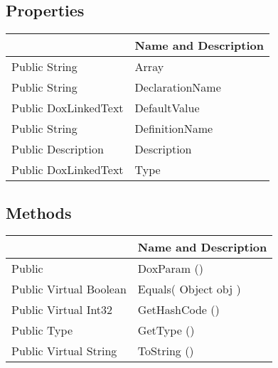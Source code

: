 \documentclass[11pt, oneside, a4paper]{book}
\begin{document}
\subsection{Properties}
\begin{center}
\begin{tabular}{| p{3cm} | p{12cm} | }
\hline
\textbf{ } & \textbf{ Name and Description}\\
\hline
 Public  String &  Array\hypertarget{SoftwareEngineeringTools.{}Documentation.{}DoxParam.{}Array}{}\\
\hline
 Public  String &  DeclarationName\hypertarget{SoftwareEngineeringTools.{}Documentation.{}DoxParam.{}DeclarationName}{}\\
\hline
 Public  DoxLinkedText &  DefaultValue\hypertarget{SoftwareEngineeringTools.{}Documentation.{}DoxParam.{}DefaultValue}{}\\
\hline
 Public  String &  DefinitionName\hypertarget{SoftwareEngineeringTools.{}Documentation.{}DoxParam.{}DefinitionName}{}\\
\hline
 Public  Description &  Description\hypertarget{SoftwareEngineeringTools.{}Documentation.{}DoxParam.{}Description}{}\\
\hline
 Public  DoxLinkedText &  Type\hypertarget{SoftwareEngineeringTools.{}Documentation.{}DoxParam.{}Type}{}\\
\hline
\end{tabular}
\end{center}

\subsection{Methods}
\begin{center}
\begin{tabular}{| p{3cm} | p{12cm} | }
\hline
\textbf{ } & \textbf{ Name and Description}\\
\hline
 Public  &  DoxParam ()\hypertarget{SoftwareEngineeringTools.{}Documentation.{}DoxParam.{}DoxParam}{}\\
\hline
 Public  Virtual  Boolean &  Equals(\hypertarget{SoftwareEngineeringTools.{}Documentation.{}DoxParam.{}Equals\_Object}{} Object  obj  )\\
\hline
 Public  Virtual  Int32 &  GetHashCode ()\hypertarget{SoftwareEngineeringTools.{}Documentation.{}DoxParam.{}GetHashCode}{}\\
\hline
 Public  Type &  GetType ()\hypertarget{SoftwareEngineeringTools.{}Documentation.{}DoxParam.{}GetType}{}\\
\hline
 Public  Virtual  String &  ToString ()\hypertarget{SoftwareEngineeringTools.{}Documentation.{}DoxParam.{}ToString}{}\\
\hline
\end{tabular}
\end{center}
 
\end{document}
